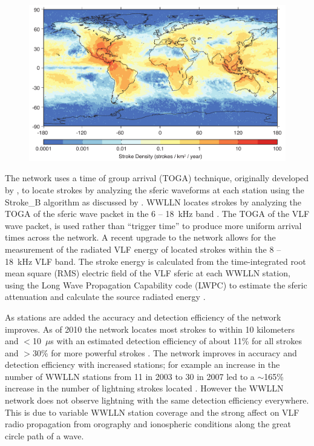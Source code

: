 \begin{figure}[ht!]
	\centering
	\includegraphics[scale=1]{Introduction/Figures/wwlln_density.pdf}\\
	\caption{ }
	\label{intro:fig:wwlln}
\end{figure}

The network uses a time of group arrival (TOGA) technique, originally developed by \citet{Dowden2002d}, to locate strokes by analyzing the sferic waveforms at each station using the Stroke\_B algorithm as discussed by \citet{Rodger2006,Rodger2009}.
WWLLN locates strokes by analyzing the TOGA of the sferic wave packet in the 6 -- 18~kHz band \citep{Dowden2000}.
The TOGA of the VLF wave packet, is used rather than ``trigger time'' to produce more uniform arrival times across the network.
A recent upgrade to the network allows for the measurement of the radiated VLF energy of located strokes within the 8 -- 18~kHz VLF band.
The stroke energy is calculated from the time-integrated root mean square (RMS) electric field of the VLF sferic at each WWLLN station, using the Long Wave Propagation Capability code (LWPC) \citep{Ferguson1998} to estimate the sferic attenuation and calculate the source radiated energy \citep{Hutchins2012}.

As stations are added the accuracy and detection efficiency of the network improves.
As of 2010 the network locates most strokes to within 10 kilometers and $<$10~$\mu$s with an estimated detection efficiency of about 11\% for all strokes and $>$30\% for more powerful strokes \citep{Abarca2010,Rodger2009}.
The network improves in accuracy and detection efficiency with increased stations; for example an increase in the number of WWLLN stations from 11 in 2003 to 30 in 2007 led to a $\sim$165\% increase in the number of lightning strokes located \citep{Rodger2009}.
However the WWLLN network does not observe lightning with the same detection efficiency everywhere.
This is due to variable WWLLN station coverage and the strong affect on VLF radio propagation from orography and ionospheric conditions along the great circle path of a wave.

